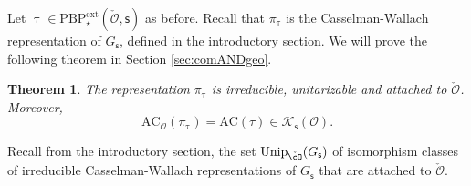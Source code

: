 \documentclass[12pt,a4paper]{amsart}
\newcommand{\CK}{{\mathcal {K}}}
\newcommand{\CO}{{\mathcal {O}}}
\numberwithin{equation}{section}
\newtheorem{thm}{Theorem}[section]
\theoremstyle{remark}
\def\Unip{\mathrm{Unip}}
\def\PBPe{\mathrm{PBP}^{\mathrm{ext}}}
\begin{document}
Let $\uptau\in \PBPe_\star(\check \CO,\mathsf s)$  as before. Recall that $\pi_\uptau$ is the Casselman-Wallach representation of $G_{\mathsf s}$, defined in the introductory section.
We will prove the following theorem in Section \ref{sec:comANDgeo}.

\begin{thm}\label{thmpitau}
The representation $\pi_\uptau$ is irreducible, unitarizable and attached to $\check \CO$. Moreover,
\[
\mathrm{AC}_\CO(\pi_\uptau)=\mathrm{AC}(\tau)\in \CK_{\mathsf s}(\CO).
\]
\end{thm}


Recall from the introductory section, the set $\Unip_{\check \cO}(G_\mathsf s)$ of isomorphism classes of irreducible Casselman-Wallach representations of $G_\mathsf s$ that are attached to $\check \CO$.
\end{document}
